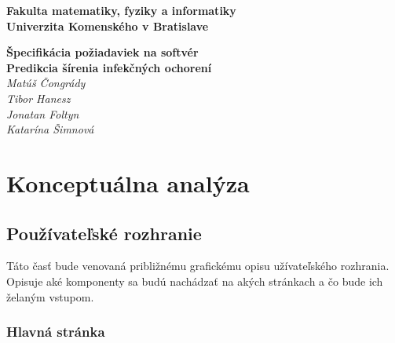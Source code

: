 \documentclass[12pt,a4paper]{report}
\begin{document}
\begin{titlepage}
\centering\bfseries
		Fakulta matematiky, fyziky a informatiky\\Univerzita Komenského v Bratislave	

	\fontsize{23}{28}\textbf{Špecifikácia požiadaviek na softvér}\\
	\fontsize{16}{22}\textbf{Predikcia šírenia infekčných ochorení}\\
	\large\textit{Matúš Čongrády\\Tibor Hanesz\\Jonatan Foltyn\\Katarína Šimnová}

\end{titlepage}\bigskip
	\setcounter{tocdepth}{9}
	\tableofcontents

\renewcommand{\chaptername}{}	
\chapter[Konceptuálna analýza]{\rmfamily\bfseries
	Konceptuálna analýza}

\section[Používateľské rozhranie]{\rmfamily\bfseries
	Používateľské rozhranie}
Táto  časť  bude  venovaná približnému  grafickému  opisu užívateľského  rozhrania. Opisuje aké komponenty sa budú nachádzať na akých stránkach a čo bude ich želaným vstupom.

\subsection[Hlavná stránka]{\rmfamily\bfseries
	Hlavná stránka}
\end{document}
